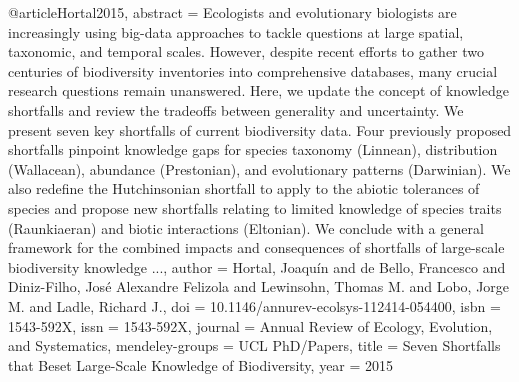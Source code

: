{{{{{@article{Hortal2015,
abstract = {Ecologists and evolutionary biologists are increasingly using big-data approaches to tackle questions at large spatial, taxonomic, and temporal scales. However, despite recent efforts to gather two centuries of biodiversity inventories into comprehensive databases, many crucial research questions remain unanswered. Here, we update the concept of knowledge shortfalls and review the tradeoffs between generality and uncertainty. We present seven key shortfalls of current biodiversity data. Four previously proposed shortfalls pinpoint knowledge gaps for species taxonomy (Linnean), distribution (Wallacean), abundance (Prestonian), and evolutionary patterns (Darwinian). We also redefine the Hutchinsonian shortfall to apply to the abiotic tolerances of species and propose new shortfalls relating to limited knowledge of species traits (Raunkiaeran) and biotic interactions (Eltonian). We conclude with a general framework for the combined impacts and consequences of shortfalls of large-scale biodiversity knowledge ...},
author = {Hortal, Joaqu{\'{i}}n and de Bello, Francesco and Diniz-Filho, Jos{\'{e}} Alexandre Felizola and Lewinsohn, Thomas M. and Lobo, Jorge M. and Ladle, Richard J.},
doi = {10.1146/annurev-ecolsys-112414-054400},
isbn = {1543-592X},
issn = {1543-592X},
journal = {Annual Review of Ecology, Evolution, and Systematics},
mendeley-groups = {UCL PhD/Papers},
title = {{Seven Shortfalls that Beset Large-Scale Knowledge of Biodiversity}},
year = {2015}
}

}}}}}
